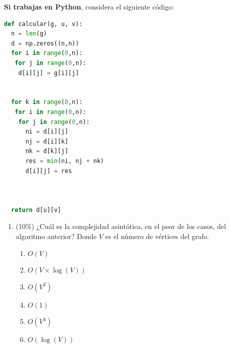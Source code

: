 \documentclass[10 pt]{article}
\begin{document}
\newpage

\textbf{Si trabajas en Python}, considera el siguiente código:

\begin{lstlisting}[language = python]
def calcular(g, u, v):
  n = len(g)
  d = np.zeros((n,n))
  for i in range(0,n):
   for j in range(0,n): 
    d[i][j] = g[i][j]
      
  
  for k in range(0,n):
   for i in range(0,n):
    for j in range(0,n):
      ni = d[i][j]
      nj = d[i][k]
      nk = d[k][j]
      res = min(ni, nj + nk)
      d[i][j] = res
    
     
  
  return d[u][v]
\end{lstlisting}

  \begin{enumerate}[label=(\Alph*)]
    \item (10\%) ¿Cuál es la complejidad asintótica, en el peor de los casos, del algoritmo anterior? Donde $V$ es el número de vértices del grafo.
    \begin{enumerate}[label=\roman*)]
      \item $O(V)$
      \item $O(V \times \log(V))$
      \item $O(V^2)$
      \item $O(1)$
      \item $O(V^3)$
      \item $O(\log(V))$
    \end{enumerate}
  \end{enumerate}


\newpage
\end{document}
